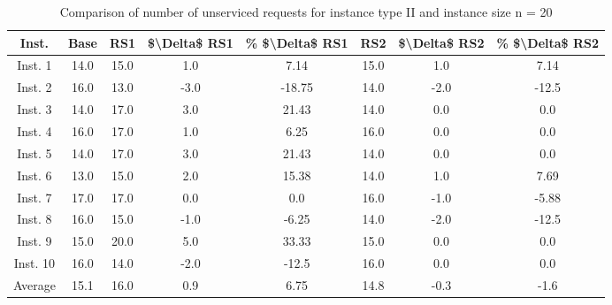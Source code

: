 \begin{table}[H]
\centering
\begin{tabular}{cccccccc}
  \hline
  \textbf{Inst.} & \textbf{Base} & \textbf{RS1} & \textbf{\$\textbackslash{}Delta\$  RS1} & \textbf{\% \$\textbackslash{}Delta\$  RS1} & \textbf{RS2} & \textbf{\$\textbackslash{}Delta\$  RS2} & \textbf{\% \$\textbackslash{}Delta\$  RS2} \\\hline
  Inst. 1 & 14.0 & 15.0 & 1.0 & 7.14 & 15.0 & 1.0 & 7.14 \\
  Inst. 2 & 16.0 & 13.0 & -3.0 & -18.75 & 14.0 & -2.0 & -12.5 \\
  Inst. 3 & 14.0 & 17.0 & 3.0 & 21.43 & 14.0 & 0.0 & 0.0 \\
  Inst. 4 & 16.0 & 17.0 & 1.0 & 6.25 & 16.0 & 0.0 & 0.0 \\
  Inst. 5 & 14.0 & 17.0 & 3.0 & 21.43 & 14.0 & 0.0 & 0.0 \\
  Inst. 6 & 13.0 & 15.0 & 2.0 & 15.38 & 14.0 & 1.0 & 7.69 \\
  Inst. 7 & 17.0 & 17.0 & 0.0 & 0.0 & 16.0 & -1.0 & -5.88 \\
  Inst. 8 & 16.0 & 15.0 & -1.0 & -6.25 & 14.0 & -2.0 & -12.5 \\
  Inst. 9 & 15.0 & 20.0 & 5.0 & 33.33 & 15.0 & 0.0 & 0.0 \\
  Inst. 10 & 16.0 & 14.0 & -2.0 & -12.5 & 16.0 & 0.0 & 0.0 \\
  Average & 15.1 & 16.0 & 0.9 & 6.75 & 14.8 & -0.3 & -1.6 \\\hline
\end{tabular}
\caption{Comparison of number of unserviced requests for instance type II and instance size n = 20}
\label{tab:wait:resrelocation-nTaxi-comparison_II_20}
\end{table}
